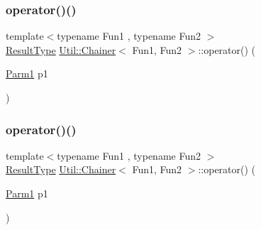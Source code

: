 \mbox{\label{classUtil_1_1Chainer_a44584550044ef436126ff4293c9502da}} 
\subsubsection{\texorpdfstring{operator()()}{operator()()}\hspace{0.1cm}{\footnotesize\ttfamily [3/12]}}
{\footnotesize\ttfamily template$<$typename Fun1 , typename Fun2 $>$ \\
\mbox{\hyperlink{classUtil_1_1Chainer_a2c8d88a77b8ba93eb915dc799ddafbb9}{Result\+Type}} \mbox{\hyperlink{classUtil_1_1Chainer}{Util\+::\+Chainer}}$<$ Fun1, Fun2 $>$\+::operator() (\begin{DoxyParamCaption}\item[{\mbox{\hyperlink{classUtil_1_1Chainer_a3e09b2267dabdd8d12070b09c47749c6}{Parm1}}}]{p1 }\end{DoxyParamCaption})\hspace{0.3cm}{\ttfamily [inline]}}

\mbox{\label{classUtil_1_1Chainer_a44584550044ef436126ff4293c9502da}} 
\subsubsection{\texorpdfstring{operator()()}{operator()()}\hspace{0.1cm}{\footnotesize\ttfamily [4/12]}}
{\footnotesize\ttfamily template$<$typename Fun1 , typename Fun2 $>$ \\
\mbox{\hyperlink{classUtil_1_1Chainer_a2c8d88a77b8ba93eb915dc799ddafbb9}{Result\+Type}} \mbox{\hyperlink{classUtil_1_1Chainer}{Util\+::\+Chainer}}$<$ Fun1, Fun2 $>$\+::operator() (\begin{DoxyParamCaption}\item[{\mbox{\hyperlink{classUtil_1_1Chainer_a3e09b2267dabdd8d12070b09c47749c6}{Parm1}}}]{p1 }\end{DoxyParamCaption})\hspace{0.3cm}{\ttfamily [inline]}}

